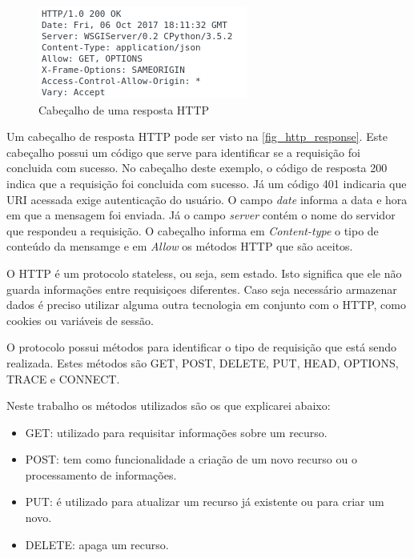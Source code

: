 \documentclass[
	12pt,				%
	openright,			%
	oneside,			%
	a4paper,			%
	english,			%
	french,				%
	spanish,			%
	brazil				%
	]{abntex2}
\begin{document}
\begin{figure}[htb]
	\caption{\label{fig_http_response} Cabeçalho de uma resposta HTTP}
	\begin{center}
		\includegraphics[scale=0.7]{http_response.png}
	\end{center}
\end{figure}

Um cabeçalho de resposta HTTP pode ser visto na \autoref{fig_http_response}. Este cabeçalho possui um código que serve para identificar se a requisição foi concluida com sucesso. No cabeçalho deste exemplo, o código de resposta 200 indica que a requisição foi concluida com sucesso. Já um código 401 indicaria que URI acessada exige autenticação do usuário. O campo \textit{date} informa a data e hora em que a mensagem foi enviada. Já o campo \textit{server} contém o nome do servidor que respondeu a requisição. O cabeçalho informa em \textit{Content-type} o tipo de conteúdo da mensamge e em \textit{Allow} os métodos HTTP que são aceitos.

O HTTP é um protocolo stateless, ou seja, sem estado. Isto significa que ele não guarda informações entre requisiçoes diferentes. Caso seja necessário armazenar dados é preciso utilizar alguma outra tecnologia em conjunto com o HTTP, como cookies ou variáveis de sessão.

O protocolo possui métodos para identificar o tipo de requisição que está sendo realizada. Estes métodos são GET, POST, DELETE, PUT, HEAD, OPTIONS, TRACE e CONNECT. 

Neste trabalho os métodos utilizados são os que explicarei abaixo:

\begin{itemize}
	\item GET: utilizado para requisitar informações sobre um recurso.
	\item POST: tem como funcionalidade a criação de um novo recurso ou o processamento de informações. 
	\item PUT: é utilizado para atualizar um recurso já existente ou para criar um novo.
	\item DELETE: apaga um recurso.     
\end{itemize} 
\end{document}
